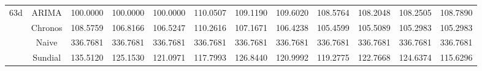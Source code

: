 \begin{table}[h!]
{\begin{tabular}{cccccccccccc}
\midrule
\multirow[c]{4}{*}{63d} & ARIMA & 100.0000 & 100.0000 & 100.0000 & 110.0507 & 109.1190 & 109.6020 & 108.5764 & 108.2048 & 108.2505 & 108.7890 \\
 & Chronos & 108.5759 & 106.8166 & 106.5247 & 110.2616 & 107.1671 & 106.4238 & 105.4599 & 105.5089 & 105.2983 & 105.2983 \\
 & Naive & 336.7681 & 336.7681 & 336.7681 & 336.7681 & 336.7681 & 336.7681 & 336.7681 & 336.7681 & 336.7681 & 336.7681 \\
 & Sundial & 135.5120 & 125.1530 & 121.0971 & 117.7993 & 126.8440 & 120.9992 & 119.2775 & 122.7668 & 124.6374 & 115.6296 \\
\bottomrule
\end{tabular}

 }
\end{table}